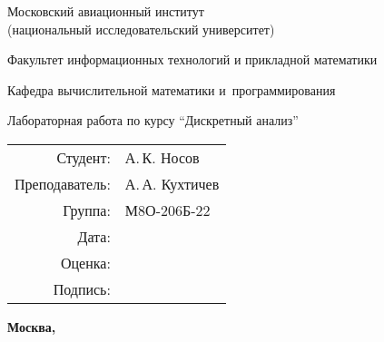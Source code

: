 \documentclass[pdf, unicode, 12pt, a4paper,oneside,fleqn]{article}
\begin{document}
\begin{titlepage}
    \begin{center}
    \bfseries
    
    {\Large Московский авиационный институт\\ (национальный исследовательский университет)
    
    }
    
    \vspace{48pt}
    
    {\large Факультет информационных технологий и прикладной математики
    }
    
    \vspace{36pt}
    
    {\large Кафедра вычислительной математики и~программирования
    
    }
    
    
    \vspace{48pt}
    
    Лабораторная работа  по курсу \enquote{Дискретный анализ}
    
    \end{center}
    
    \vspace{72pt}
    
    \begin{flushright}
    \begin{tabular}{rl}
    Студент: & А.\,К. Носов \\
    Преподаватель: & А.\,А. Кухтичев \\
    Группа: & М8О-206Б-22 \\
    Дата: & \\
    Оценка: & \\
    Подпись: & \\
    \end{tabular}
    \end{flushright}
    
    \vfill
    
    \begin{center}
    \bfseries
    Москва, \the\year
    \end{center}
    \end{titlepage}
    
    \pagebreak

\end{document}
